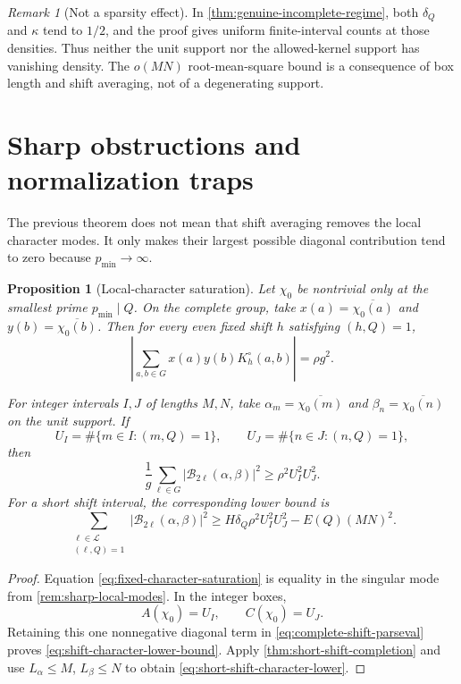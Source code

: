 \documentclass[11pt]{article}
\newtheorem{proposition}[theorem]{Proposition}
\theoremstyle{definition}
\theoremstyle{remark}
\newtheorem{remark}[theorem]{Remark}
\newcommand{\cB}{\mathcal B}
\newcommand{\cL}{\mathcal L}
\begin{document}
\begin{remark}[Not a sparsity effect]\label{rem:not-sparsity-effect}
In \cref{thm:genuine-incomplete-regime}, both $\delta_Q$ and $\kappa$ tend to $1/2$, and the proof gives uniform finite-interval counts at those densities.  Thus neither the unit support nor the allowed-kernel support has vanishing density.  The $o(MN)$ root-mean-square bound is a consequence of box length and shift averaging, not of a degenerating support.
\end{remark}

\section{Sharp obstructions and normalization traps}\label{sec:obstructions}

The previous theorem does not mean that shift averaging removes the local character modes.  It only makes their largest possible diagonal contribution tend to zero because $p_{\min}\to\infty$.

\begin{proposition}[Local-character saturation]\label{prop:local-character-saturation}
Let $\chi_0$ be nontrivial only at the smallest prime $p_{\min}\mid Q$.  On the complete group, take $x(a)=\overline{\chi_0(a)}$ and $y(b)=\overline{\chi_0(b)}$.  Then for every even fixed shift $h$ satisfying $(h,Q)=1$,
\begin{equation}\label{eq:fixed-character-saturation}
 \left|\sum_{a,b\in G}x(a)y(b)K_h^\circ(a,b)\right|
 =\rho g^2.
\end{equation}

For integer intervals $I,J$ of lengths $M,N$, take $\alpha_m=\overline{\chi_0(m)}$ and $\beta_n=\overline{\chi_0(n)}$ on the unit support.  If
\[
 U_I=\#\{m\in I:(m,Q)=1\},
 \qquad
 U_J=\#\{n\in J:(n,Q)=1\},
\]
then
\begin{equation}\label{eq:shift-character-lower-bound}
 \frac1g\sum_{\ell\in G}|\cB_{2\ell}(\alpha,\beta)|^2
 \ge\rho^2U_I^2U_J^2.
\end{equation}
For a short shift interval, the corresponding lower bound is
\begin{equation}\label{eq:short-shift-character-lower}
 \sum_{\substack{\ell\in\cL\\(\ell,Q)=1}}
 |\cB_{2\ell}(\alpha,\beta)|^2
 \ge H\delta_Q\rho^2U_I^2U_J^2-E(Q)(MN)^2.
\end{equation}
\end{proposition}

\begin{proof}
Equation \eqref{eq:fixed-character-saturation} is equality in the singular mode from \cref{rem:sharp-local-modes}.  In the integer boxes,
\[
 A(\chi_0)=U_I,
 \qquad C(\chi_0)=U_J.
\]
Retaining this one nonnegative diagonal term in \eqref{eq:complete-shift-parseval} proves \eqref{eq:shift-character-lower-bound}.  Apply \cref{thm:short-shift-completion} and use $L_\alpha\le M$, $L_\beta\le N$ to obtain \eqref{eq:short-shift-character-lower}.
\end{proof}
\end{document}
